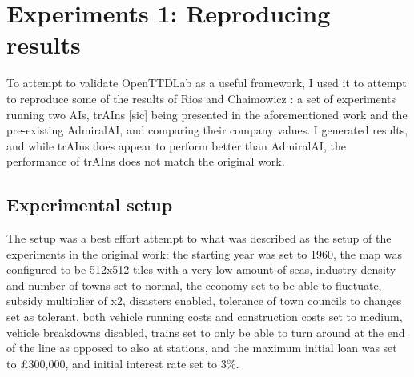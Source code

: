 \documentclass[logo,msc,dsti]{style/infthesis}    %
\begin{document}
{%


\chapter{Experiments 1: Reproducing results}
\label{chapter:experiments-attempt-at-reproducing}

To attempt to validate OpenTTDLab as a useful framework, I used it to attempt to reproduce some of the results of Rios and Chaimowicz \cite{rios2009trains}: a set of experiments running two AIs, trAIns [sic] being presented in the aforementioned work and the pre-existing AdmiralAI, and comparing their company values. I generated results, and while trAIns does appear to perform better than AdmiralAI, the performance of trAIns does not match the original work.

\section{Experimental setup}

The setup was a best effort attempt to what was described as the setup of the experiments in the original work: the starting year was set to 1960, the map was configured to be 512x512 tiles with a very low amount of seas, industry density and number of towns set to normal, the economy set to be able to fluctuate, subsidy multiplier of x2, disasters enabled, tolerance of town councils to changes set as tolerant, both vehicle running costs and construction costs set to medium, vehicle breakdowns disabled, trains set to only be able to turn around at the end of the line as opposed to also at stations, and the maximum initial loan was set to £300,000, and initial interest rate set to 3\%.

}
\end{document}

